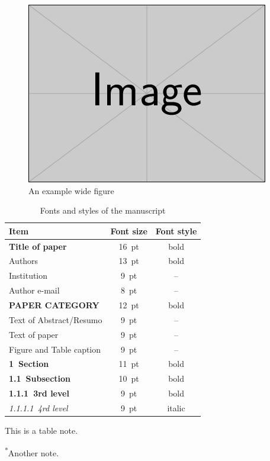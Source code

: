 \documentclass[alpha-refs,english]{RBCA_v3.0}
\begin{document}
\begin{figure}%
	\centering
	\includegraphics[width=.6\textwidth]{example-image}
	\caption{An example wide figure}
	\label{fig:example:wide}
\end{figure}


\begin{table}[ht]
	\centering
		\begin{threeparttable}
		\caption{Fonts and styles of the manuscript}
		\label{tab:example}
		\begin{tabular}{lcc}
			\toprule
			Item & Font size & Font style\\
			\toprule
			{\fontsize{16pt}{27pt}\bfseries Title of paper} & 16~pt & bold\\
			{\fontsize{13pt}{18pt}Authors} & 13~pt & bold\\
			{\fontsize{9pt}{13pt}Institution} & 9~pt & --\\
			{\fontsize{8pt}{9.5pt}Author e-mail} & 8~pt & --\\
			{\fontsize{10pt}{16pt}\bfseries\MakeUppercase{Paper category}} & 12~pt & bold\\
			{\fontsize{9pt}{11pt}Text of Abstract/Resumo} & 9~pt & --\\
			{\fontsize{9pt}{10.5pt}Text of paper} & 9~pt & --\\
			{\fontsize{9pt}{9pt}Figure and Table caption} & 9~pt & --\\
			{\fontsize{11pt}{12pt}\bfseries 1~Section} & 11~pt &	bold\\
			{\fontsize{10pt}{11pt}\bfseries 1.1~Subsection} & 10~pt &	bold\\
			{\fontsize{9pt}{11pt}\bfseries 1.1.1~3rd level} & 9~pt & bold\\
			{\fontsize{9pt}{11pt}\itshape 1.1.1.1~4rd level} & 9~pt & italic\\
			\bottomrule
		\end{tabular}

	\begin{tablenotes}
		\footnotesize
		\item This is a table note.
		\item \textsuperscript{*}Another note.
	\end{tablenotes}

\end{threeparttable}
\end{table}
\end{document}
